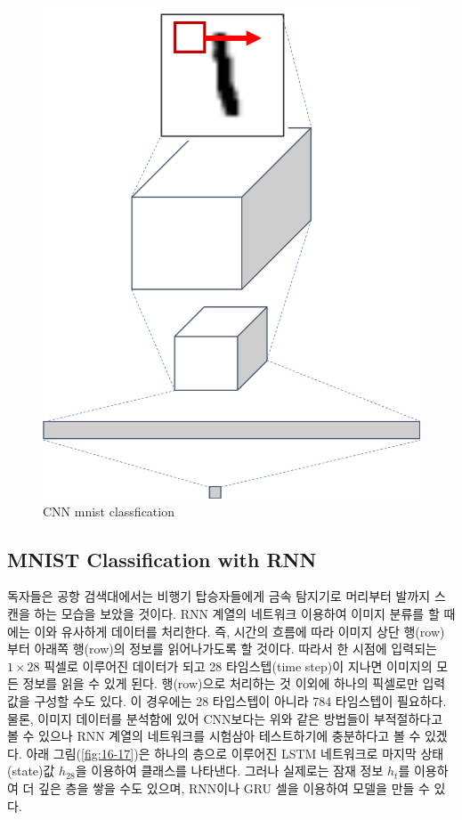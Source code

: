 \documentclass[draft=false]{oblivoir}
\begin{document}
\begin{figure}[ht] \centering 
  \includegraphics[scale=0.5]{fig16.png}
  \caption{CNN mnist classfication}
  \label{fig:16-16}
\end{figure}

\subsection{MNIST Classification with RNN}
독자들은 공항 검색대에서는 비행기 탑승자들에게 금속 탐지기로 머리부터 발까지 스캔을 하는 모습을 보았을 것이다. RNN 계열의 네트워크 이용하여 이미지 분류를 할 때에는 이와 유사하게 데이터를 처리한다. 즉, 시간의 흐름에 따라 이미지 상단 행(row)부터 아래쪽 행(row)의 정보를 읽어나가도록 할 것이다. 따라서 한 시점에 입력되는 $1 \times 28$ 픽셀로 이루어진 데이터가 되고 28 타임스텝(time step)이 지나면 이미지의 모든 정보를 읽을 수 있게 된다. 행(row)으로 처리하는 것 이외에 하나의 픽셀로만 입력값을 구성할 수도 있다. 이 경우에는 28 타입스텝이 아니라 784 타임스텝이 필요하다. 물론, 이미지 데이터를 분석함에 있어 CNN보다는 위와 같은 방법들이 부적절하다고 볼 수 있으나 RNN 계열의 네트워크를 시험삼아 테스트하기에 충분하다고 볼 수 있겠다. 아래 그림(\ref{fig:16-17})은 하나의 층으로 이루어진 LSTM 네트워크로 마지막 상태(state)값 $h_{28}$을 이용하여 클래스를 나타낸다. 그러나 실제로는 잠재 정보 $h_t$를 이용하여 더 깊은 층을 쌓을 수도 있으며, RNN이나 GRU 셀을 이용하여 모델을 만들 수 있다.
\end{document}
